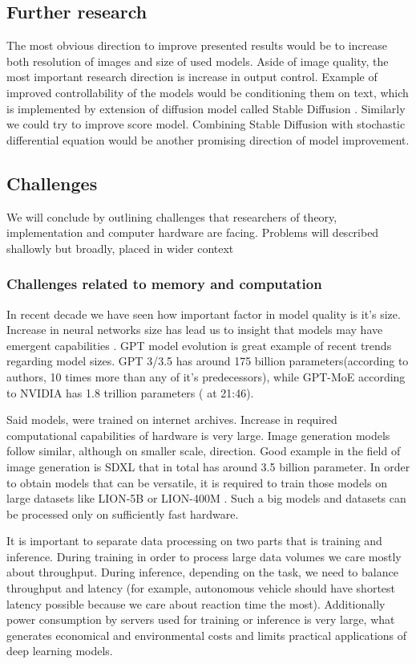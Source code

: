 \documentclass[10pt]{article}
\begin{document}
\subsection{Further research}
The most obvious direction to improve presented results would be to increase both resolution of images and size of used models. Aside of image quality, the most important research direction is increase in output control. Example of improved controllability of the models would be conditioning them on text, which is implemented by extension of diffusion model called Stable Diffusion \cite{stable_diff}\cite{SDXL}. Similarly we could try to improve score model. Combining Stable Diffusion with stochastic differential equation would be another promising direction of model improvement.

\subsection{Challenges}
We will conclude by outlining challenges that researchers of theory, implementation and computer hardware are facing. Problems will described shallowly but broadly, placed in wider context
\subsubsection{Challenges related to memory and computation}
In recent decade we have seen how important factor in model quality is it's size. Increase in neural networks size has lead us to insight that models may have emergent capabilities \cite{emergent}. GPT model evolution is great example of recent trends regarding model sizes.  GPT 3/3.5  has around 175 billion parameters(according to authors, 10 times more than any of it's predecessors), while GPT-MoE according to NVIDIA has 1.8 trillion parameters (\cite{nvidia_gtc} at 21:46). 

Said models, were trained on internet archives. Increase in required computational capabilities of hardware is very large. Image generation models follow similar, although on smaller scale, direction. Good example in the field of image generation is SDXL \cite{SDXL} that in total has around 3.5 billion parameter. In order to obtain models that can be versatile, it is required to train those models on large datasets like LION-5B or LION-400M \cite{lion_dataset}. Such a big models and datasets can be processed only on sufficiently fast hardware.

It is important to separate data processing on two parts that is training and inference. During training 
in order to process large data volumes we care mostly about throughput. During inference, depending on the task, we need to balance throughput and latency (for example, autonomous vehicle should have shortest latency possible because we care about reaction time the most). Additionally power consumption by servers used for training or inference is very large, what generates economical and environmental costs and limits practical applications of deep learning models. 
\end{document}
